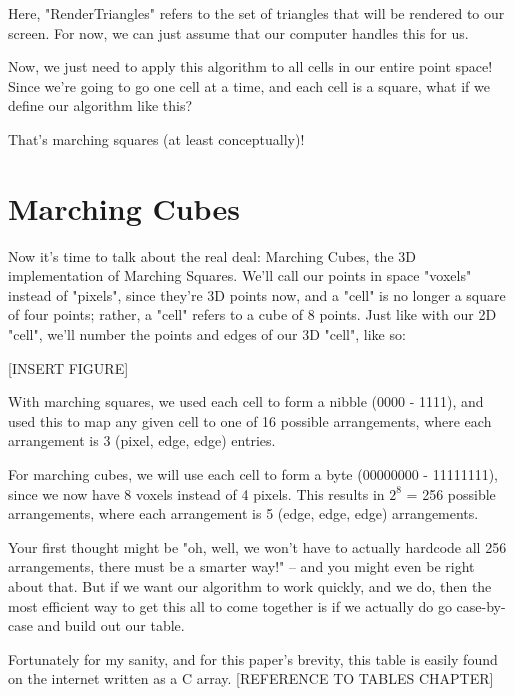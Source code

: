 \documentclass[12pt,twoside]{reedthesis}
\begin{document}
Here, "RenderTriangles" refers to the set of triangles that will be rendered to our screen. For now, we can just assume that our computer handles this for us.

Now, we just need to apply this algorithm to all cells in our entire point space! Since we're going to go one cell at a time, and each cell is a square, what if we define our algorithm like this?

\begin{algorithm}
\end{algorithm}
    
That's marching squares (at least conceptually)!

\section{Marching Cubes}

Now it's time to talk about the real deal: Marching Cubes, the 3D implementation of Marching Squares.
We'll call our points in space "voxels" instead of "pixels", since they're 3D points now, and a "cell" is no longer a square of four points; rather, a "cell" refers to a cube of 8 points.
Just like with our 2D "cell", we'll number the points and edges of our 3D "cell", like so:

[INSERT FIGURE]

With marching squares, we used each cell to form a nibble (0000 - 1111), and used this to map any given cell to one of 16 possible arrangements, where each arrangement is 3 (pixel, edge, edge) entries.

For marching cubes, we will use each cell to form a byte (00000000 - 11111111), since we now have 8 voxels instead of 4 pixels. This results in $2^8$ = 256 possible arrangements, where each arrangement is 5 (edge, edge, edge) arrangements.

Your first thought might be "oh, well, we won't have to actually hardcode all 256 arrangements, there must be a smarter way!" -- and you might even be right about that. But if we want our algorithm to work quickly, and we do, then the most efficient way to get this all to come together is if we actually do go case-by-case and build out our table.

Fortunately for my sanity, and for this paper's brevity, this table is easily found on the internet written as a C array. [REFERENCE TO TABLES CHAPTER]
\end{document}
